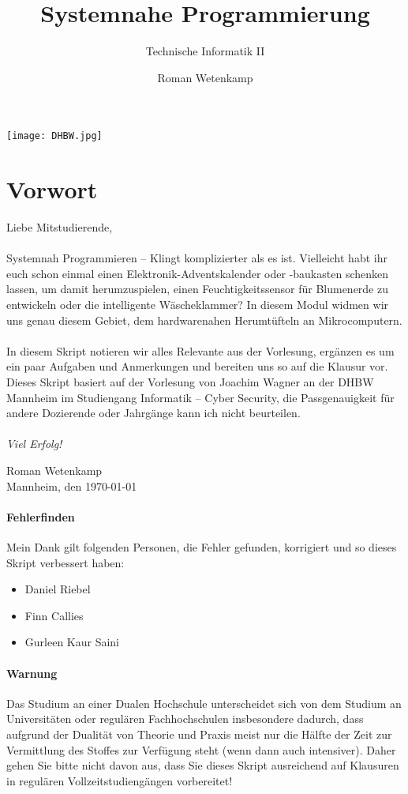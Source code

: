 \documentclass[11pt,a4paper]{scrartcl}
\author{Roman Wetenkamp}
\title{Systemnahe Programmierung}
\subtitle{Technische Informatik II}
\begin{document}
\vspace{3cm}
\maketitle
\begin{center}
\texttt{[image: DHBW.jpg]}
\end{center}
\pagebreak
\tableofcontents
\pagebreak
\section*{Vorwort}
Liebe Mitstudierende, \\\\
Systemnah Programmieren -- Klingt komplizierter als es ist. Vielleicht habt ihr euch schon einmal einen Elektronik-Adventskalender oder -baukasten schenken lassen, um damit herumzuspielen, einen Feuchtigkeitssensor für Blumenerde zu entwickeln oder die intelligente Wäscheklammer? In diesem Modul widmen wir uns genau diesem Gebiet, dem hardwarenahen Herumtüfteln an Mikrocomputern. \\\\
In diesem Skript notieren wir alles Relevante aus der Vorlesung, ergänzen es um ein paar Aufgaben und Anmerkungen und bereiten uns so auf die Klausur vor. Dieses Skript basiert auf der Vorlesung von Joachim Wagner an der DHBW Mannheim im Studiengang Informatik -- Cyber Security, die Passgenauigkeit für andere Dozierende oder Jahrgänge kann ich nicht beurteilen. \\\\
\textit{Viel Erfolg!}  \\
\begin{flushright}
Roman Wetenkamp \\
Mannheim, den \today
\end{flushright}  
\vfill
\paragraph{Fehlerfinden}
Mein Dank gilt folgenden Personen, die Fehler gefunden, korrigiert und so dieses Skript verbessert haben: 
\begin{itemize}
\item Daniel Riebel
\item Finn Callies
\item Gurleen Kaur Saini
\end{itemize}
\paragraph{Warnung}
Das Studium an einer Dualen Hochschule unterscheidet sich von dem Studium an Universitäten oder regulären Fachhochschulen insbesondere dadurch, dass aufgrund der Dualität von Theorie und Praxis meist nur die Hälfte der Zeit zur Vermittlung des Stoffes zur Verfügung steht (wenn dann auch intensiver). Daher gehen Sie bitte nicht davon aus, dass Sie dieses Skript ausreichend auf Klausuren in regulären Vollzeitstudiengängen vorbereitet!
\end{document}
